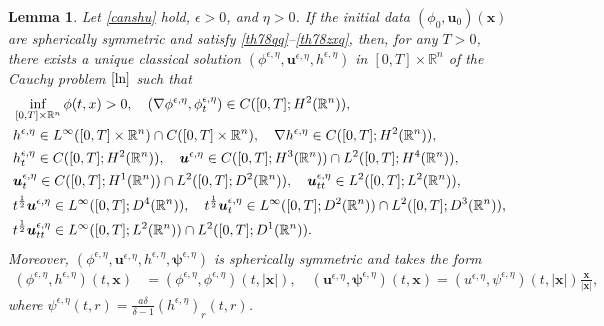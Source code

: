\documentclass[10pt,a4paper]{amsart}
\newtheorem{lem}{Lemma}
\begin{document}
\begin{lem}\label{ls}
Let \eqref{canshu} hold, $\epsilon>0$, and $\eta>0$. 
If  the initial data  $(\phi_0, \boldsymbol{u}_0)(\boldsymbol{x})$ are spherically symmetric and satisfy \eqref{th78qq}{\rm--}\eqref{th78zxq}, then, for any  $T>0$,  there exists a unique classical solution $(\phi^{\epsilon,\eta},\boldsymbol{u}^{\epsilon,\eta},h^{\epsilon,\eta})$ in $[0,T]\times \mathbb{R}^n$ of the Cauchy problem $\eqref{ln}$ such that
\begin{align}
&\inf_{[0,T]\times \mathbb{R}^n}\phi(t,x)>0,\quad (\nabla \phi^{\epsilon,\eta},\phi^{\epsilon,\eta}_t)\in C([0,T];H^2(\mathbb{R}^n)), \notag\\
&h^{\epsilon,\eta}\in L^\infty([0,T]\times \mathbb{R}^n)\cap C([0,T]\times \mathbb{R}^n),\quad \nabla h^{\epsilon,\eta}\in C([0,T];H^2(\mathbb{R}^n)),\notag\\
&h^{\epsilon,\eta}_t\in C([0,T];H^2(\mathbb{R}^n)),\quad \boldsymbol{u}^{\epsilon,\eta}\in C([0,T];H^3(\mathbb{R}^n))\cap L^2([0,T];H^4(\mathbb{R}^n)),\label{linearregularity}\\
& \boldsymbol{u}^{\epsilon,\eta}_t\in C([0,T];H^1(\mathbb{R}^n))\cap L^2([0,T];D^2(\mathbb{R}^n)),\quad \boldsymbol{u}^{\epsilon,\eta}_{tt}\in L^2([0,T];L^2(\mathbb{R}^n)),\notag\\
&t^{\frac{1}{2}}\boldsymbol{u}^{\epsilon,\eta}\in L^\infty([0,T];D^4(\mathbb{R}^n)), \quad t^{\frac{1}{2}}\boldsymbol{u}^{\epsilon,\eta}_t\in L^\infty([0,T];D^2(\mathbb{R}^n))\cap L^2([0,T];D^3(\mathbb{R}^n)),\notag\\
& t^{\frac{1}{2}}\boldsymbol{u}^{\epsilon,\eta}_{tt}\in L^\infty([0,T];L^2(\mathbb{R}^n))\cap L^2([0,T];D^1(\mathbb{R}^n)).\notag
\end{align}
Moreover, $(\phi^{\epsilon,\eta},\boldsymbol{u}^{\epsilon,\eta},h^{\epsilon,\eta},\boldsymbol{\psi}^{\epsilon,\eta})$ is  spherically symmetric and takes the form
\begin{equation}\label{2..}
\begin{aligned}
(\phi^{\epsilon,\eta},h^{\epsilon,\eta})(t, \boldsymbol{x})&=(\phi^{\epsilon,\eta},\phi^{\epsilon,\eta})(t,|\boldsymbol{x}|),\quad 
(\boldsymbol{u}^{\epsilon,\eta},\boldsymbol{\psi}^{\epsilon,\eta})(t, \boldsymbol{x})=(u^{\epsilon,\eta}, \psi^{\epsilon,\eta})(t,|\boldsymbol{x}|) \frac{\boldsymbol{x}}{|\boldsymbol{x}|},
\end{aligned}
\end{equation} 
where  $\psi^{\epsilon,\eta}(t,r)=\frac{a\delta}{\delta-1}(h^{\epsilon,\eta})_r(t,r)$.
\end{lem}
\end{document}
